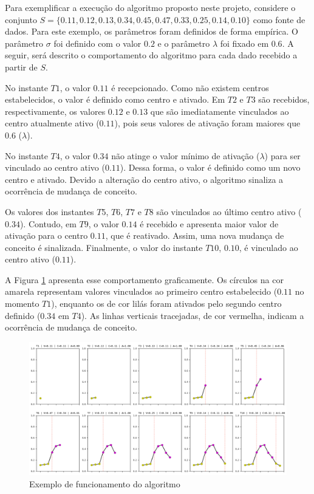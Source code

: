 \documentclass[msc, classic, a4paper]{ufbathesis}
\begin{document}
Para exemplificar a execução do algoritmo proposto neste projeto, considere o conjunto $S = \{0.11, 0.12, 0.13, 0.34, 0.45, 0.47, 0.33, 0.25, 0.14, 0.10\}$ como fonte de dados.
Para este exemplo, os parâmetros foram definidos de forma empírica. O parâmetro \textit{$\sigma$} foi definido com o valor $0.2$ e o parâmetro \textit{$\lambda$} foi fixado em $0.6$.
A seguir, será descrito o comportamento do algoritmo para cada dado recebido a partir de $S$.

No instante $T1$, o valor $0.11$ é recepcionado. Como não existem centros estabelecidos, o valor é definido como centro e ativado.
Em $T2$ e $T3$ são recebidos, respectivamente, os valores $0.12$ e $0.13$ que são imediatamente vinculados ao centro atualmente ativo ($0.11$), pois seus valores de ativação foram maiores que $0.6$ ($\lambda$).

No instante $T4$, o valor $0.34$ não atinge o valor mínimo de ativação (\textit{$\lambda$}) para ser vinculado ao centro ativo ($0.11$).
Dessa forma, o valor é definido como um novo centro e ativado.
Devido a alteração do centro ativo, o algoritmo sinaliza a ocorrência de mudança de conceito.

Os valores dos instantes $T5$, $T6$, $T7$ e $T8$ são vinculados ao último centro ativo ($0.34$).
Contudo, em $T9$, o valor $0.14$ é recebido e apresenta maior valor de ativação para o centro $0.11$, que é reativado.
Assim, uma nova mudança de conceito é sinalizada.
Finalmente, o valor do instante $T10$, $0.10$, é vinculado ao centro ativo ($0.11$).

A Figura \ref{fig:funcionamento_algoritmo} apresenta esse comportamento graficamente.
Os círculos na cor amarela representam valores vinculados ao primeiro centro estabelecido ($0.11$ no momento $T1$),
enquanto os de cor lilás foram ativados pelo segundo centro definido ($0.34$ em $T4$).
As linhas verticais tracejadas, de cor vermelha, indicam a ocorrência de mudança de conceito.

\begin{figure}[H]
\begin{center}
    \includegraphics[width=\textwidth]{imagens/funcionamento_algoritmo.png}
    \caption{Exemplo de funcionamento do algoritmo}
    \label{fig:funcionamento_algoritmo}
\end{center}
\end{figure}
\end{document}
